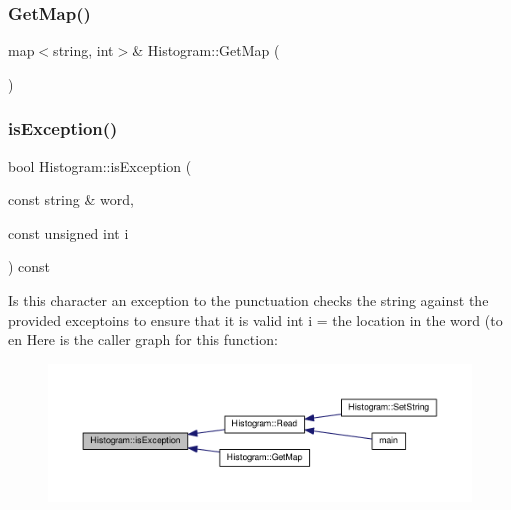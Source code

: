 \subsubsection{\texorpdfstring{Get\+Map()}{GetMap()}\hspace{0.1cm}{\footnotesize\ttfamily [2/2]}}
{\footnotesize\ttfamily map$<$string, int$>$\& Histogram\+::\+Get\+Map (\begin{DoxyParamCaption}{ }\end{DoxyParamCaption})\hspace{0.3cm}{\ttfamily [inline]}}

\mbox{\label{class_histogram_aff24f16064c037ca8929c4f9751aedbf}} 
\subsubsection{\texorpdfstring{is\+Exception()}{isException()}}
{\footnotesize\ttfamily bool Histogram\+::is\+Exception (\begin{DoxyParamCaption}\item[{const string \&}]{word,  }\item[{const unsigned int}]{i }\end{DoxyParamCaption}) const}

Is this character an exception to the punctuation checks the string against the provided exceptoins to ensure that it is valid int i = the location in the word (to en Here is the caller graph for this function\+:
\nopagebreak
\begin{figure}[H]
\begin{center}
\leavevmode
\includegraphics[width=350pt]{class_histogram_aff24f16064c037ca8929c4f9751aedbf_icgraph}
\end{center}
\end{figure}
\mbox{\label{class_histogram_aa1ae3a4f490aef85530afc028867b8f4}} 
